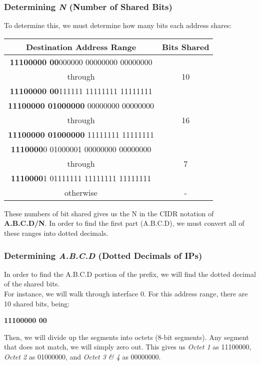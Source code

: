 \documentclass[colorlinks=true, allcolors=blue]{article}
\begin{document}
\subsubsection{Determining \textit{N} (Number of Shared Bits)}
To determine this, we must determine how many bits each address shares:

\renewcommand{\arraystretch}{1.5}
\begin{center}
\begin{tabular}{|c|c|}
\hline
\textbf{Destination Address Range} & \textbf{Bits Shared} \\
\hline
\textbf{11100000 00}000000 00000000 00000000 & \\
through & 10 \\
\textbf{11100000 00}111111 11111111 11111111 & \\
\hline
\textbf{11100000 01000000} 00000000 00000000 & \\
through & 16 \\
\textbf{11100000 01000000} 11111111 11111111 & \\
\hline
\textbf{1110000}0 01000001 00000000 00000000 & \\
through & 7 \\
\textbf{1110000}1 01111111 11111111 11111111 & \\
\hline
otherwise & - \\
\hline  
\end{tabular}
\end{center}

These numbers of bit shared gives us the N in the CIDR notation of \textbf{A.B.C.D/N}. In order to find the first part (A.B.C.D), we must convert all of these ranges into dotted decimals.

\subsubsection{Determining \textit{A.B.C.D} (Dotted Decimals of IPs)}

In order to find the A.B.C.D portion of the prefix, we will find the dotted decimal of the shared bits. \\

For instance, we will walk through interface 0. For this address range, there are 10 shared bits, being:

\begin{center}\textbf{11100000 00}\end{center}

Then, we will divide up the segments into octets (8-bit segments). Any segment that does not match, we will simply zero out. This gives us \textit{Octet 1} as 11100000, \textit{Octet 2} as 01000000, and \textit{Octet 3 \& 4} as 00000000. \\
\end{document}
